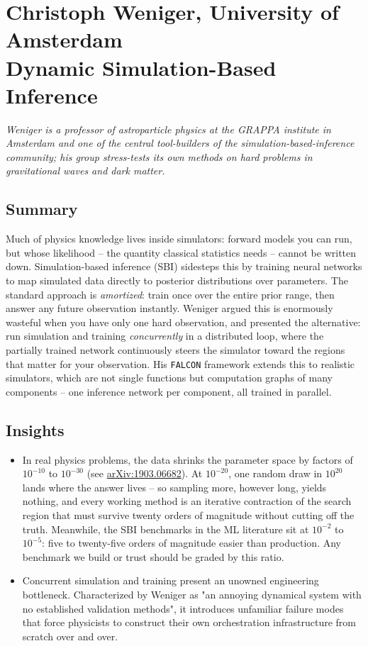 \documentclass[11pt]{article}
\begin{document}
\section{Christoph Weniger, University of Amsterdam\\
{\large Dynamic Simulation-Based Inference}}

\emph{Weniger is a professor of astroparticle physics at the GRAPPA institute in Amsterdam and one of the central tool-builders of the simulation-based-inference community; his group stress-tests its own methods on hard problems in gravitational waves and dark matter.}

\subsection*{Summary}
Much of physics knowledge lives inside simulators: forward models you can run, but whose likelihood -- the quantity classical statistics needs -- cannot be written down. Simulation-based inference (SBI) sidesteps this by training neural networks to map simulated data directly to posterior distributions over parameters. The standard approach is \emph{amortized}: train once over the entire prior range, then answer any future observation instantly. Weniger argued this is enormously wasteful when you have only one hard observation, and presented the alternative: run simulation and training \emph{concurrently} in a distributed loop, where the partially trained network continuously steers the simulator toward the regions that matter for your observation. His \texttt{FALCON} framework extends this to realistic simulators, which are not single functions but computation graphs of many components -- one inference network per component, all trained in parallel.

\subsection*{Insights}
\begin{itemize}
    \item In real physics problems, the data shrinks the parameter space by factors of $10^{-10}$ to $10^{-30}$ (see \href{https://arxiv.org/abs/1903.06682}{arXiv:1903.06682}). At $10^{-20}$, one random draw in $10^{20}$ lands where the answer lives -- so sampling more, however long, yields nothing, and every working method is an iterative contraction of the search region that must survive twenty orders of magnitude without cutting off the truth. Meanwhile, the SBI benchmarks in the ML literature sit at $10^{-2}$ to $10^{-5}$: five to twenty-five orders of magnitude easier than production. Any benchmark we build or trust should be graded by this ratio.
    \item Concurrent simulation and training present an unowned engineering bottleneck. Characterized by Weniger as "an annoying dynamical system with no established validation methods", it introduces unfamiliar failure modes that force physicists to construct their own orchestration infrastructure from scratch over and over.
\end{itemize}
\end{document}
